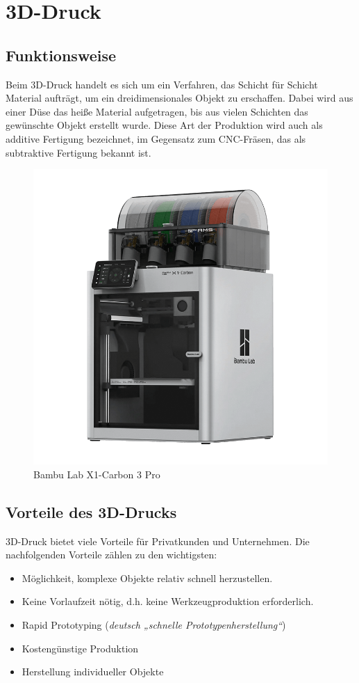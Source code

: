 \newpage
\section{3D-Druck}
\subsection{Funktionsweise}
Beim 3D-Druck handelt es sich um ein Verfahren, das Schicht für Schicht Material aufträgt, um ein dreidimensionales Objekt zu erschaffen. Dabei wird aus einer Düse das heiße Material aufgetragen, bis aus vielen Schichten das gewünschte Objekt erstellt wurde. Diese Art der Produktion wird auch als additive Fertigung bezeichnet, im Gegensatz zum CNC-Fräsen, das als subtraktive Fertigung bekannt ist.


\begin{figure}[H]
	\centering
	\includegraphics[width=0.5\linewidth]{images/3D-Drucker.png}
	\caption[Bambu Lab X1-Carbon 3 Pro]{Bambu Lab X1-Carbon 3 Pro}
	\label{fig:3D-Druck}
\end{figure}


\subsection{Vorteile des 3D-Drucks}
3D-Druck bietet viele Vorteile für Privatkunden und Unternehmen. Die nachfolgenden Vorteile zählen zu den wichtigsten:
\begin{itemize}
	\item Möglichkeit, komplexe Objekte relativ schnell herzustellen.
	\item Keine Vorlaufzeit nötig, d.h. keine Werkzeugproduktion erforderlich.
	\item Rapid Prototyping (\textit{deutsch „schnelle Prototypenherstellung“})
	\item Kostengünstige Produktion
	\item Herstellung individueller Objekte
\end{itemize} \parencite{3DDruckVorteile}

